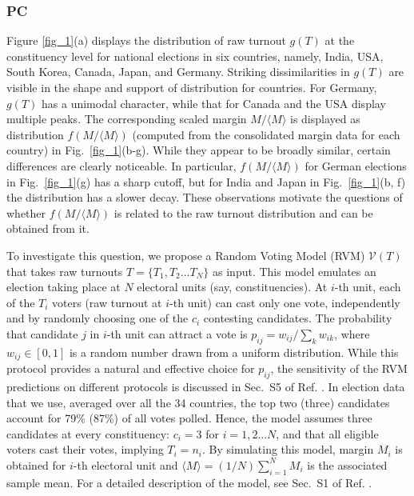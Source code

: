 \subsubsection{PC}
Figure \ref{fig_1}(a) displays the distribution of raw turnout $g(T)$ at the constituency level for national elections in six countries, namely, India, USA, South Korea, Canada, Japan, and Germany. Striking dissimilarities in $g(T)$ are visible in the shape and support of distribution for countries. For Germany, $g(T)$ has a unimodal character, while that for Canada and the USA display multiple peaks. The corresponding scaled margin $M/\langle M \rangle$ is displayed as distribution $f(M/\langle M \rangle)$ (computed from the consolidated margin data for each country) in Fig.~\ref{fig_1}(b-g). While they appear to be broadly similar, certain differences are clearly noticeable. In particular, $f(M/\langle M \rangle)$ for German elections in Fig.~\ref{fig_1}(g) has a sharp cutoff, but for India and Japan in Fig.~\ref{fig_1}(b, f) the distribution has a slower decay. These observations motivate the questions of whether $f(M/\langle M \rangle)$ is related to the raw turnout distribution and can be obtained from it.

To investigate this question, we propose a Random Voting Model (RVM) ${\mathcal V}(T)$ that takes raw turnouts $T=\{T_1, T_2 \dots T_N\}$ as input. This model emulates an election taking place at $N$ electoral units (say, constituencies). At $i$-th unit, each of the $T_i$ voters (raw turnout at $i$-th unit) can cast only one vote, independently and by randomly choosing one of the $c_i$ contesting candidates. The probability that candidate $j$ in $i$-th unit can attract a vote is $p_{ij}= w_{ij}/\sum_k w_{ik}$, where $w_{ij} \in [0,1]$ is a random number drawn from a uniform distribution. While this protocol provides a natural and effective choice for $p_{ij}$, the sensitivity of the RVM predictions on different protocols is discussed in Sec.~S5 of Ref. \cite{supp}. In election data that we use, averaged over all the 34 countries, the top two (three) candidates account for 79\% (87\%) of all votes polled. Hence, the model assumes three candidates at every constituency: $c_i=3$ for $i=1,2 \dots N$, and that all eligible voters cast their votes, implying $T_i = n_i$. By simulating this model, margin $M_i$ is obtained for $i$-th electoral unit and $\langle M \rangle = (1/N) \sum_{i=1}^N M_i$ is the associated sample mean. For a detailed description of the model, see Sec.~S1 of Ref. \cite{supp}. 

